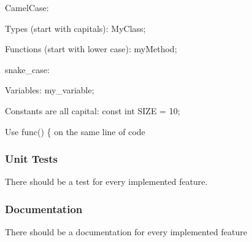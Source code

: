 
\begin{DoxyItemize}
\item {\ttfamily Camel\+Case}\+:
\begin{DoxyItemize}
\item Types (start with capitals)\+: {\ttfamily My\+Class};
\item Functions (start with lower case)\+: {\ttfamily my\+Method};
\end{DoxyItemize}
\item {\ttfamily snake\+\_\+case}\+:
\begin{DoxyItemize}
\item Variables\+: {\ttfamily my\+\_\+variable};
\end{DoxyItemize}
\item Constants are all capital\+: {\ttfamily const int S\+I\+ZE = 10;}
\item Use {\ttfamily func() \{} on the same line of code
\end{DoxyItemize}

\subsubsection*{Unit Tests}

There should be a test for every implemented feature.

\subsubsection*{Documentation}

There should be a documentation for every implemented feature 